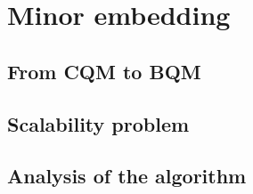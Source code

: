 \section[Minor embedding]{Minor embedding}
\label{sec:me}

\subsection{From CQM to BQM}

\subsection{Scalability problem}

\subsection{Analysis of the algorithm}